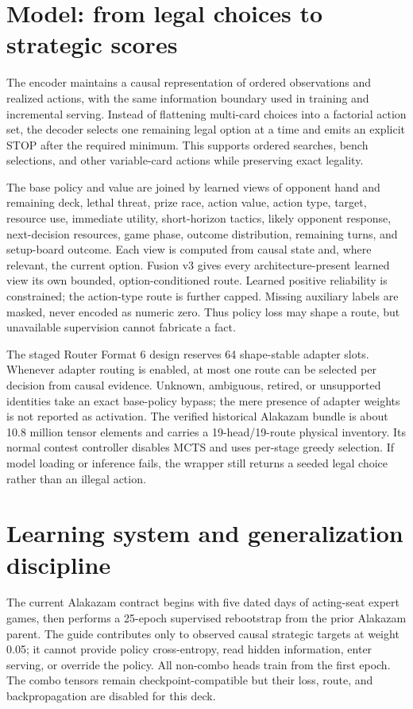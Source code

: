 \documentclass[10pt]{article}
\begin{document}
\section*{Model: from legal choices to strategic scores}

The encoder maintains a causal representation of ordered observations and realized actions, with the same information boundary used in training and incremental serving. Instead of flattening multi-card choices into a factorial action set, the decoder selects one remaining legal option at a time and emits an explicit STOP after the required minimum. This supports ordered searches, bench selections, and other variable-card actions while preserving exact legality.

The base policy and value are joined by learned views of opponent hand and remaining deck, lethal threat, prize race, action value, action type, target, resource use, immediate utility, short-horizon tactics, likely opponent response, next-decision resources, game phase, outcome distribution, remaining turns, and setup-board outcome. Each view is computed from causal state and, where relevant, the current option. Fusion v3 gives every architecture-present learned view its own bounded, option-conditioned route. Learned positive reliability is constrained; the action-type route is further capped. Missing auxiliary labels are masked, never encoded as numeric zero. Thus policy loss may shape a route, but unavailable supervision cannot fabricate a fact.

The staged Router Format 6 design reserves 64 shape-stable adapter slots. Whenever adapter routing is enabled, at most one route can be selected per decision from causal evidence. Unknown, ambiguous, retired, or unsupported identities take an exact base-policy bypass; the mere presence of adapter weights is not reported as activation. The verified historical Alakazam bundle is about 10.8 million tensor elements and carries a 19-head/19-route physical inventory. Its normal contest controller disables MCTS and uses per-stage greedy selection. If model loading or inference fails, the wrapper still returns a seeded legal choice rather than an illegal action.

\section*{Learning system and generalization discipline}

The current Alakazam contract begins with five dated days of acting-seat expert games, then performs a 25-epoch supervised rebootstrap from the prior Alakazam parent. The guide contributes only to observed causal strategic targets at weight 0.05; it cannot provide policy cross-entropy, read hidden information, enter serving, or override the policy. All non-combo heads train from the first epoch. The combo tensors remain checkpoint-compatible but their loss, route, and backpropagation are disabled for this deck.
\end{document}
